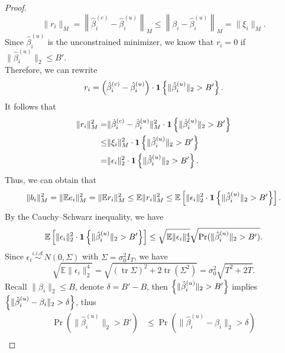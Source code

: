 \begin{proof}
\begin{equation}
\|r_i\|_M
=
\left\|
\hat{\beta}_i^{(c)} - \hat{\beta}_i^{(u)}
\right\|_M
\le 
\left\|
\beta_i - \hat{\beta}_i^{(u)}
\right\|_M
=
\|\xi_i\|_M.
\end{equation}
Since $\hat{\beta}_i^{(u)}$ is the unconstrained minimizer, we know that
$r_i=0$ if $\|\hat{\beta}_i^{(u)}\|_2\le B'$.\\
Therefore, we can rewrite
\[
r_i 
= \left({
\hat{\beta}_i^{(c)} - \hat{\beta}_i^{(u)}
}\right)\cdot \mathbf{1} \left\{{\|\hat{\beta}_i^{(u)}\|_2>B'}\right\}.
\]
It follows that
\begin{align*}
\|r_i\|_M^2
=&\|\hat{\beta}_i^{(c)} - \hat{\beta}_i^{(u)}\|_M^2 \cdot \mathbf{1} \left\{{\|\hat{\beta}_i^{(u)}\|_2>B'}\right\}\\
\le&
\|\xi_i\|_M^2
\cdot \mathbf{1} \left\{{\|\hat{\beta}_i^{(u)}\|_2>B'}\right\}\\
=& \|\epsilon_i\|_2^2
\cdot \mathbf{1} \left\{{\|\hat{\beta}_i^{(u)}\|_2>B'}\right\}.
\end{align*}
Thus, we can obtain that
\begin{equation}
    \|b_i\|_M^2
    =
    \| \mathbb E e_i \|_M^2
    =
    \| \mathbb E r_i \|_M^2
    \le
    \mathbb E \|r_i\|_M^2
    \le
    \mathbb E \left[{
    \|\epsilon_i\|_2^2
    \cdot \mathbf{1} \left\{{\|\hat{\beta}_i^{(u)}\|_2>B'}\right\}
    }\right].
\label{eq: clipping bias bound_RKHS}
\end{equation}
By the Cauchy--Schwarz inequality, we have
\begin{equation}
    \mathbb E \left[{
    \|\epsilon_i\|_2^2
    \cdot \mathbf{1} \left\{{\|\hat{\beta}_i^{(u)}\|_2>B'}\right\}
    }\right]
    \leq
    \sqrt{\mathbb E \|\epsilon_i\|_2^4} \sqrt{\operatorname{Pr}(\|\hat{\beta}_i^{(u)}\|_2>B')}.
    \label{eq: Cauchy--Schwarz inequality_RKHS}
\end{equation}
Since $\epsilon_i\overset{i.i.d.}{\sim} N(0,\Sigma)$ with $\Sigma = \sigma_0^2 I_T$, we have
\begin{equation}
\sqrt{\mathbb E \|\epsilon_i\|_2^4}
=
\sqrt{(\operatorname{tr}\Sigma)^2 + 2\operatorname{tr}(\Sigma^{2})}
= \sigma_0^2 \sqrt{T^2+2T}.
\label{eq: 4th moment guassian bound_RKHS}
\end{equation}
Recall $\|\beta_i\|_2\le B$, denote $\delta=B'-B$, then 
$\left\{{\|\hat{\beta}_i^{(u)}\|_2>B'}\right\}$ implies 
$\left\{{\|\hat{\beta}_i^{(u)}-\beta_i\|_2>\delta}\right\}$, thus
\begin{align*}
\operatorname{Pr}(\|\hat{\beta}_i^{(u)}\|_2>B')
&\le
\operatorname{Pr}(\|\hat{\beta}_i^{(u)}-\beta_i\|_2>\delta)
\\

\end{align*}
\end{proof}
